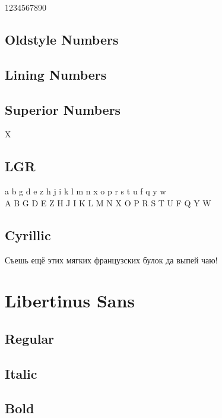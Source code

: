 \documentclass{article}
\begin{document}
1234567890

\subsection*{Oldstyle Numbers}

{}

\subsection*{Lining Numbers}

{}

\subsection*{Superior Numbers}

X

\subsection*{LGR}


{\ifxetex\else\ifluatex\else\libertinusseriflgr\fi\fi
\noindent
 a b g d e z h j i k l m n x o p r s t u f q y w\\
 A B G D E Z H J I K L M N X O P R S T U F Q Y W\\
}

\subsection*{Cyrillic}

{\ifxetex\else\ifluatex\else{}\selectfont\fi\fi
Съешь ещё этих мягких французских булок да
выпей чаю!}

\clearpage
\section{Libertinus Sans}\sf


\subsection*{Regular}
\lipsum[1]


\subsection*{Italic}
\textit{\lipsum[2]}

\subsection*{Bold}
\textbf{\lipsum[3]}
\end{document}
